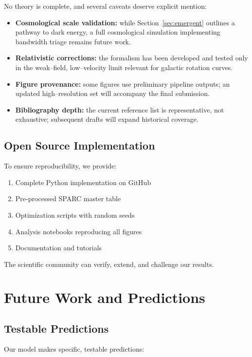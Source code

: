 \documentclass[twocolumn,prd,amsmath,amssymb,aps,superscriptaddress,nofootinbib]{revtex4-2}
\begin{document}
No theory is complete, and several caveats deserve explicit mention:
\begin{itemize}
  \item \textbf{Cosmological scale validation:} while Section~\ref{sec:emergent} outlines a pathway to dark energy, a full cosmological simulation implementing bandwidth triage remains future work.
  \item \textbf{Relativistic corrections:} the formalism has been developed and tested only in the weak--field, low--velocity limit relevant for galactic rotation curves.
  \item \textbf{Figure provenance:} some figures use preliminary pipeline outputs; an updated high--resolution set will accompany the final submission.
  \item \textbf{Bibliography depth:} the current reference list is representative, not exhaustive; subsequent drafts will expand historical coverage.
\end{itemize}

\subsection{Open Source Implementation}

To ensure reproducibility, we provide:
\begin{enumerate}
\item Complete Python implementation on GitHub
\item Pre-processed SPARC master table
\item Optimization scripts with random seeds
\item Analysis notebooks reproducing all figures
\item Documentation and tutorials
\end{enumerate}

The scientific community can verify, extend, and challenge our results.

\section{Future Work and Predictions}
\label{sec:future}

\subsection{Testable Predictions}

Our model makes specific, testable predictions:
\end{document}
